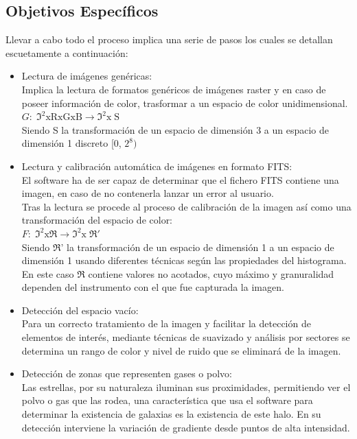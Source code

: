 	\subsection{Objetivos Específicos}
	Llevar a cabo todo el proceso implica una serie de pasos los cuales se detallan escuetamente a continuación:
	\begin{itemize}
		\item Lectura de imágenes genéricas:\\
		Implica la lectura de formatos genéricos de imágenes raster y en caso de poseer información de color, trasformar a un espacio de color unidimensional.\\
		$G:\mathfrak{\;I^{2}\mathrm{xRxGxB}\rightarrow\mathfrak{I^{2}\mathrm{x\;S}}}$\\
		Siendo S la transformación de un espacio de dimensión 3 a un espacio de dimensión 1 discreto {[}0, $2^{8})$ 
		
		\item Lectura y calibración automática de imágenes en formato FITS:\\
		El software ha de ser capaz de determinar que el fichero FITS contiene
		una imagen, en caso de no contenerla lanzar un error al usuario. \\
		Tras la lectura se procede al proceso de calibración de la imagen
		así como una transformación del espacio de color:\\
		$F:\mathfrak{\;I^{2}\mathrm{x\mathfrak{R}}\rightarrow\mathfrak{I^{2}\mathrm{x\;\mathfrak{R'}}}}$\\
		Siendo $\mathfrak{R}$' la transformación de un espacio de dimensión
		1 a un espacio de dimensión 1 usando diferentes técnicas según las
		propiedades del histograma. En este caso $\mathfrak{R}$ contiene
		valores no acotados, cuyo máximo y granuralidad dependen del instrumento
		con el que fue capturada la imagen.
		
		\item Detección del espacio vacío:\\
		Para un correcto tratamiento de la imagen y facilitar la detección
		de elementos de interés, mediante técnicas de suavizado y análisis
		por sectores se determina un rango de color y nivel de ruido que se
		eliminará de la imagen.
		
		\item Detección de zonas que representen gases o polvo:\\
		Las estrellas, por su naturaleza iluminan sus proximidades, permitiendo
		ver el polvo o gas que las rodea, una característica que usa el software
		para determinar la existencia de galaxias es la existencia de este
		halo. En su detección interviene la variación de gradiente desde puntos
		de alta intensidad.


\end{itemize}
